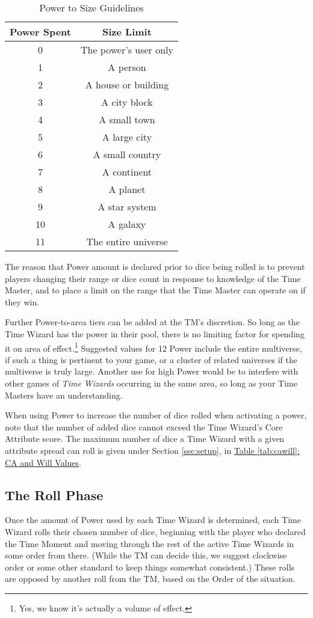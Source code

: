 \documentclass[twoside]{article}
\newcommand{\tw}{\emph{Time Wizards}}
\begin{document}
\begin{wraptable}{o}{0.5\textwidth}
   \caption{Power to Size Guidelines}
   \label{tab:powersize}

   \begin{tabular}{c|c}
      \textbf{Power Spent} & {Size Limit}\\ \hline
      0 & The power's user only\\
      1 & A person\\
      2 & A house or building\\
      3 & A city block\\
      4 & A small town\\
      5 & A large city\\
      6 & A small country\\
      7 & A continent\\
      8 & A planet\\
      9 & A star system\\
      10 & A galaxy\\
      11 & The entire universe
   \end{tabular}
\end{wraptable}

The reason that Power amount is declared prior to dice being rolled is to prevent players
changing their range or dice count in response to knowledge of the Time Master, and to place a
limit on the range that the Time Master can operate on if they win.

Further Power-to-area tiers can be added at the TM's discretion. So long as the Time Wizard has
the power in their pool, there is no limiting factor for spending it on area of
effect.\footnote{Yes, we know it's actually a volume of effect.} Suggested values for 12 Power
include the entire multiverse, if such a thing is pertinent to your game, or a cluster of
related universes if the multiverse is truly large. Another use for high Power would be to
interfere with other games of \tw{} occurring in the same area, so long as your Time Masters
have an understanding.

When using Power to increase the number of dice rolled when activating a power, note that the
number of added dice cannot exceed the Time Wizard's Core Attribute score. The maximum number
of dice a Time Wizard with a given attribute spread can roll is given under Section
\ref*{sec:setup}, in \hyperref[tab:cawill]{Table \ref*{tab:cawill}: CA and Will Values}.

\subsection{The Roll Phase} \label{ssec:roll-phase}
Once the amount of Power used by each Time Wizard is determined, each Time Wizard rolls their
chosen number of dice, beginning with the player who declared the Time Moment and moving through
the rest of the active Time Wizards in some order from there. (While the TM can decide this, we
suggest clockwise order or some other standard to keep things somewhat consistent.) These rolls
are opposed by another roll from the TM, based on the Order of the situation.
\end{document}
